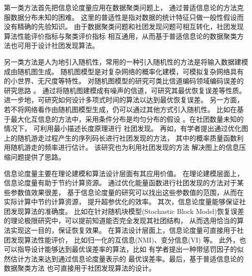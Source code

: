 第一类方法首先把信息论度量应用在数据聚类问题上，
通过普适信息论的方法克服数据分布未知的困难\cite{raman20219}。
这里的普适性是指对数据的统计特征只做一般性假设而没有精确的先验知识。
由于数据聚类问题和社团发现问题可相互转化，社团发现算法性能评价指标与聚类评价指标
相互通用，从而基于普适信息论的数据聚类方法也可用于设计社团发现算法。

另一类方法是人为地引入随机性，常用的一种引入随机性的方法是将输入数据建模成由随机图生成。
随机图模型是对复杂网络的概率化建模，可模拟复杂网络具有的小世界、无尺度等特性。
对随机图模型的研究可类比信道编码领域编码误差的研究思路 \cite{abbe2015community}。
通过将随机图建模成有噪声的信道，可研究其最优恢复误差等性质。
进一步地，可研究如何设计多项式时间的算法以达到最优恢复误差。
另一方面，若不将网络看作由随机图模型生成，仍可以通过其他方式引入随机性。
比如在基于最大化互信息的方法中，采用条件分布是均匀分布的假设
\cite{rosvall2007information}。在社团数量未知的情况下，
可利用最小描述长度原理进行
社团发现\cite{chakrabarti2004autopart,rosvall2007information}。
再如，有学者提出通过优化图上的随机游走过程产生的序列码长进行社团发现的方法，
其中的概率质量函数利用随机游走的频率进行估计\cite{rosvall2008mcl}。
该研究也为利用社团发现的方法
解决图上的信息压缩问题提供了思路\cite{abbe17sideinfo}。

信息论度量主要在理论建模和算法设计层面有其应用价值。
在理论建模层面上，信息论度量有助于节约计算资源。
通过优化能量函数进行社团发现的方法对于某些参数值效果很差，
基于信息论度量的研究可以找出这些参数值的范围，从而在实际计算中节约计算资源，
提升超参优化的效率\cite{ye2020exact}。
其次，信息论度量能够保证社团发现算法的准确度。
比如在针对随机块模型(Stochastic Block Model)恢复误差的理论极限研究中，可以提前知道能否完全发现其社团结构，
从而选用恰当的算法实现这一目的，保证恢复效果\cite{abbe2015community}。
在算法设计层面上，信息论度量可直接用于社团发现算法性能评价，
比如归一化的互信息(NMI)\cite{Danon_2005}、变分信息(VI) \cite{2007Comparing}等。
此外，也可以指导设计能够达到最优误差率的算法，比如
有学者提出一种带惩罚因子的似然估计方法来达到通过信息论度量表示的
最优误差率\cite{zhang2016}。最后，基于普适信息论的数据聚类方法
也可直接用于社团发现算法的设计\cite{gokcay2002clustering, chan2017pin, app12094203}。


